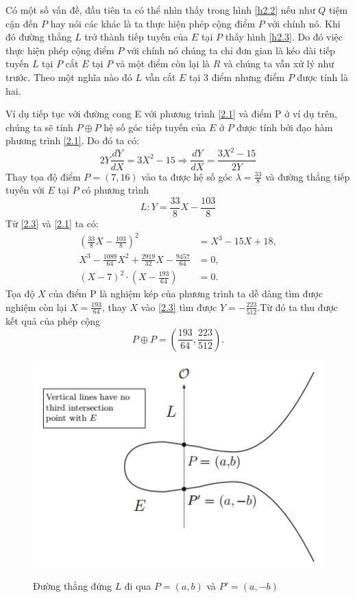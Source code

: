 \documentclass[a4paper,12pt]{report}
\begin{document}
Có một số vấn đề, đầu tiên ta có thể nhìn thấy trong hình \ref{h2.2} nếu như $Q$ tiệm cận đến $P$ hay nói các khác là ta thực hiện phép cộng điểm $P$ với chính nó. Khi đó đường thẳng $L$ trở thành tiếp tuyến của $E$ tại $P$ thấy hình \ref{h2.3}. Do đó việc thực hiện phép cộng điểm $P$ với chính nó chúng ta chỉ đơn gian là kéo dài tiếp tuyến $L$ tại $P$ cắt $E$ tại $P$ và một điểm còn lại là $R$ và chúng ta vẫn xử lý như trước. Theo một nghĩa nào đó $L$ vẫn cắt $E$ tại 3 điểm nhưng điểm $P$ được tính là hai.

Ví dụ tiếp tục với đường cong E với phương trình \ref{2.1} và điểm P ở ví dụ trên, chúng ta sẽ tính $P \oplus P$ hệ số góc tiếp tuyến của $E$ ở $P$ được tính bởi đạo hàm phương trình \ref{2.1}. Do đó ta có:
\begin{displaymath}
2Y\frac{dY}{dX} = 3X^2 - 15 \Rightarrow \frac{dY}{dX} = \frac{3X^2 - 15}{2Y}
\end{displaymath}
Thay tọa độ điểm $P = (7,16)$ vào ta được hệ số góc $\displaystyle \lambda = \frac{33}{8}$ và đường thẳng tiếp tuyến với $E$ tại $P$ có phương trình
\begin{equation}
L: Y = \frac{33}{8}X - \frac{103}{8} \label{2.3}
\end{equation}
Từ \ref{2.3} và \ref{2.1} ta có:
\begin{displaymath}
\begin{aligned}
(\frac{33}{8}X - \frac{103}{8})^2 & = X^3 - 15X + 18, \\
X^3 - \frac{1089}{64}X^2 + \frac{2919}{32}X - \frac{9457}{64} & = 0, \\
(X - 7)^2\cdot(X - \frac{193}{64}) & = 0.
\end{aligned}
\end{displaymath}
Tọa độ $X$ của điểm P là nghiệm kép của phương trình ta dễ dàng tìm được nghiệm còn lại $\displaystyle X = \frac{193}{64}$, thay $X$ vào \ref{2.3} tìm được $\displaystyle Y = -\frac{223}{512}$.Từ đó ta thu được kết quả của phép cộng
\begin{displaymath}
P \oplus P = (\frac{193}{64}, \frac{223}{512}).
\end{displaymath}

\begin{figure}[h]
\begin{center}
\includegraphics[scale=1]{../im4.png} \label{h2.4}
\caption{Đường thẳng đứng $L$ đi qua $P = (a, b)$ và $P' = (a, -b)$}
\end{center}
\end{figure}
\end{document}
